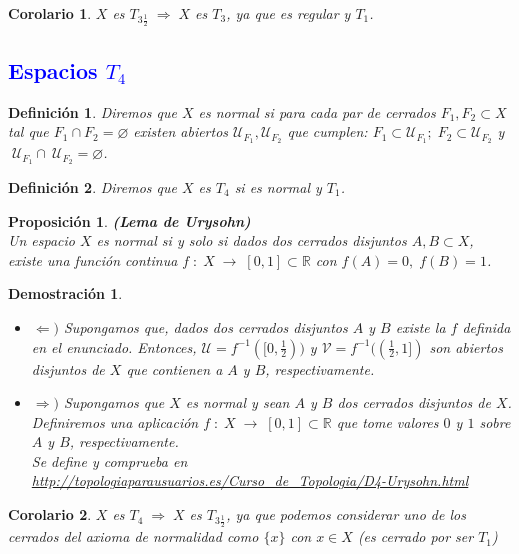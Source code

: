 \documentclass[12pt,twoside]{report}
\newcommand\mc[1]{\mathcal{#1}}
\theoremstyle{azul}
\newtheorem*{propx}{Proposición}
\newtheorem*{demx}{Demostración}
\newtheorem*{defix}{Definición}
\newtheorem*{corx}{Corolario}
\theoremstyle{azul2}
\theoremstyle{plain}
\theoremstyle{definition}
\theoremstyle{remark}
\begin{document}
\begin{corx}
$X$ es $T_{3\frac{1}{2}} \; \Rightarrow \; X$ es $T_3$, ya que es regular y $T_1$.
\end{corx}
\vspace{-17mm}
\textcolor{blue}{\section{Espacios $T_4$}}
\begin{defix}
Diremos que $X$ es normal si para cada par de cerrados $F_1, F_2 \subset X$ tal que $F_1 \cap F_2 = \varnothing$ existen abiertos $\mc{U}_{F_1}, \mc{U}_{F_2}$ que cumplen: $F_1 \subset \mc{U}_{F_1};\; F_2 \subset \mc{U}_{F_2} $ y $\; \mc{U}_{F_1} \cap \: \mc{U}_{F_2} = \varnothing$.
\end{defix}

\begin{defix}
Diremos que $X$ es $T_4$ si es normal y $T_1$.
\end{defix}

\begin{propx}\textbf{(Lema de Urysohn)}\\
Un espacio $X$ es normal si y solo si dados dos cerrados disjuntos $A,B \subset X$, existe una función continua $f\;: \; X \; \longrightarrow \; [0,1] \subset \mathbb{R}$ con $f(A) = 0,\; f(B) = 1$.
\end{propx}
\begin{demx} \; \\ \vspace{-3mm}
\begin{itemize}
    \item $\Leftarrow)$ Supongamos que, dados dos cerrados disjuntos $A$ y $B$ existe la $f$ definida en el enunciado. Entonces, $\mc{U}= f^{-1}([0,\frac{1}{2}))$ y $\mc{V} = f^{-1}((\frac{1}{2},1])$ son abiertos disjuntos de $X$ que contienen a $A$ y $B$, respectivamente.
    \item $\Rightarrow)$ Supongamos que $X$ es normal y sean $A$ y $B$ dos cerrados disjuntos de $X$. Definiremos una aplicación $f\;: \; X \; \rightarrow \; [0,1] \subset \mathbb{R}$ que tome valores $0$ y $1$ sobre $A$ y $B$, respectivamente.\\
    Se define y comprueba en \url{http://topologiaparausuarios.es/Curso_de_Topologia/D4-Urysohn.html}
\end{itemize}
\end{demx}

\begin{corx}
$X$ es $T_4 \; \Rightarrow \;  X$ es $T_{3\frac{1}{2}}$, ya que podemos considerar uno de los cerrados del axioma de normalidad como $\{x\}$ con $x \in X$ (es cerrado por ser $T_1$)
\end{corx}
\end{document}
